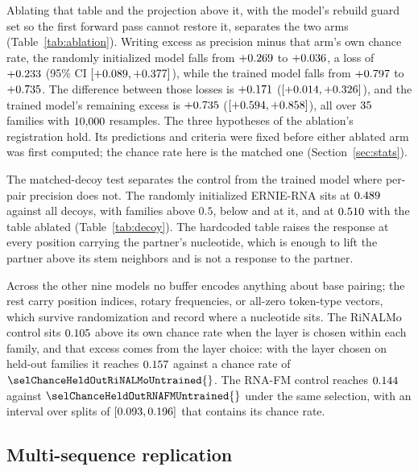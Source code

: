 \documentclass[11pt]{article}
\begin{document}
Ablating that table and the projection above it, with the model's rebuild guard
set so the first forward pass cannot restore it, separates the two arms
(Table~\ref{tab:ablation}).
Writing excess as precision minus that arm's own
chance rate, the randomly initialized model falls from
$+0.269{}$ to $+0.036{}$, a
loss of $+0.233{}$ (95\% CI $[+0.089, +0.377]{}$), while the
trained model falls from $+0.797{}$ to
$+0.735{}$. The difference between those losses is
$+0.171{}$ ($[+0.014, +0.326]{}$), and the trained
model's remaining excess is $+0.735{}$
($[+0.594, +0.858]{}$), all over $35{}$ families with
$10{,}000{}$ resamples. The three hypotheses of the ablation's registration
hold. Its predictions and criteria were fixed before either ablated arm was
first computed; the chance rate here is the matched one
(Section~\ref{sec:stats}).

The matched-decoy test separates the control from the trained model where
per-pair precision does not. The randomly initialized ERNIE-RNA sits at
$0.489{}$ against all decoys, with
\decoyAllAboveErnieRNAUntrained{} families above $0.5$,
\decoyAllBelowErnieRNAUntrained{} below and \decoyAllAtHalfErnieRNAUntrained{}
at it, and at $0.510{}$ with the table ablated
(Table~\ref{tab:decoy}). The hardcoded table raises the response at every
position carrying the partner's nucleotide, which is enough to lift the partner
above its stem neighbors and is not a response to the partner.

Across the other nine models no buffer encodes anything about base pairing;
the rest carry position indices, rotary frequencies, or all-zero token-type
vectors, which survive randomization and record where a nucleotide sits. The
RiNALMo control sits $0.105{}$ above its own chance rate
when the layer is chosen within each family, and that excess comes from the
layer choice: with the layer chosen on held-out families it reaches
$0.157{}$ against a chance rate of
$\selChanceHeldOutRiNALMoUntrained{}$. The RNA-FM control reaches
$0.144{}$ against $\selChanceHeldOutRNAFMUntrained{}$
under the same selection, with an interval over splits of
$[0.093, 0.196]{}$ that contains its chance rate.

\subsection{Multi-sequence replication}
\label{sec:multiseq-results}
\end{document}
